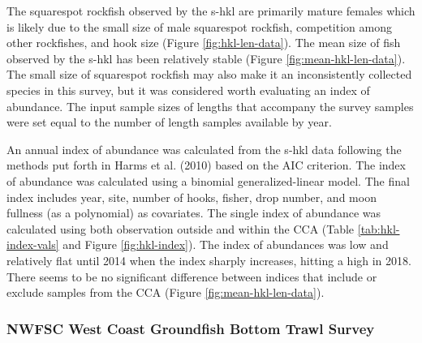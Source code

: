 \documentclass[11pt,
  english,
  a4paper,
]{article}
\begin{document}
\leavevmode\tagmcend\tagstructend\par


The squarespot rockfish observed by the \Gls{s-hkl} are primarily mature females which is likely due to the small size of male squarespot rockfish, competition among other rockfishes, and hook size (Figure \ref{fig:hkl-len-data}). The mean size of fish observed by the \Gls{s-hkl} has been relatively stable (Figure \ref{fig:mean-hkl-len-data}). The small size of squarespot rockfish may also make it an inconsistently collected species in this survey, but it was considered worth evaluating an index of abundance. The input sample sizes of lengths that accompany the survey samples were set equal to the number of length samples available by year.

\leavevmode\tagmcend\tagstructend\par


An annual index of abundance was calculated from the \Gls{s-hkl} data following the methods put forth in Harms et al. {(2010)\leavevmode\tagmcend\tagstructend} based on the AIC criterion. The index of abundance was calculated using a binomial generalized-linear model. The final index includes year, site, number of hooks, fisher, drop number, and moon fullness (as a polynomial) as covariates. The single index of abundance was calculated using both observation outside and within the CCA (Table \ref{tab:hkl-index-vals} and Figure \ref{fig:hkl-index}). The index of abundances was low and relatively flat until 2014 when the index sharply increases, hitting a high in 2018. There seems to be no significant difference between indices that include or exclude samples from the CCA (Figure \ref{fig:mean-hkl-len-data}).

\leavevmode\tagmcend\tagstructend\par


\hypertarget{nwfsc-west-coast-groundfish-bottom-trawl-survey}{%
\subsubsection{NWFSC West Coast Groundfish Bottom Trawl Survey}\label{nwfsc-west-coast-groundfish-bottom-trawl-survey}}

\leavevmode\tagmcend\tagstructend
\end{document}
